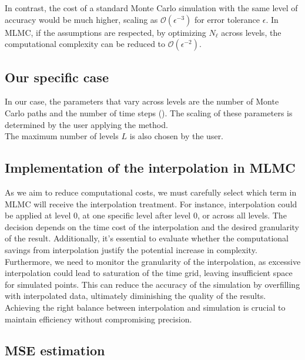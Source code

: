 \documentclass{article}
\begin{document}
In contrast, the cost of a standard Monte Carlo simulation with the same level of accuracy would be much higher, scaling as \( \mathcal{O}(\epsilon^{-3}) \) for error tolerance \( \epsilon \). In MLMC, if the assumptions are respected, by optimizing \( N_\ell \) across levels, the computational complexity can be reduced to \( \mathcal{O}(\epsilon^{-2}) \). \\

\subsection*{Our specific case}

In our case, the parameters that vary across levels are the number of Monte Carlo paths and the number of time steps (\cite{hofer2018accelerating}). The scaling of these parameters is determined by the user applying the method. \\ 
The maximum number of levels $L$ is also chosen by the user.

\subsection{Implementation of the interpolation in MLMC}

As we aim to reduce computational costs, we must carefully select which term in MLMC will receive the interpolation treatment. For instance, interpolation could be applied at level 0, at one specific level after level 0, or across all levels. The decision depends on the time cost of the interpolation and the desired granularity of the result. Additionally, it's essential to evaluate whether the computational savings from interpolation justify the potential increase in complexity.\\

Furthermore, we need to monitor the granularity of the interpolation, as excessive interpolation could lead to saturation of the time grid, leaving insufficient space for simulated points. This can reduce the accuracy of the simulation by overfilling with interpolated data, ultimately diminishing the quality of the results. Achieving the right balance between interpolation and simulation is crucial to maintain efficiency without compromising precision.

\subsection{MSE estimation}
\end{document}
